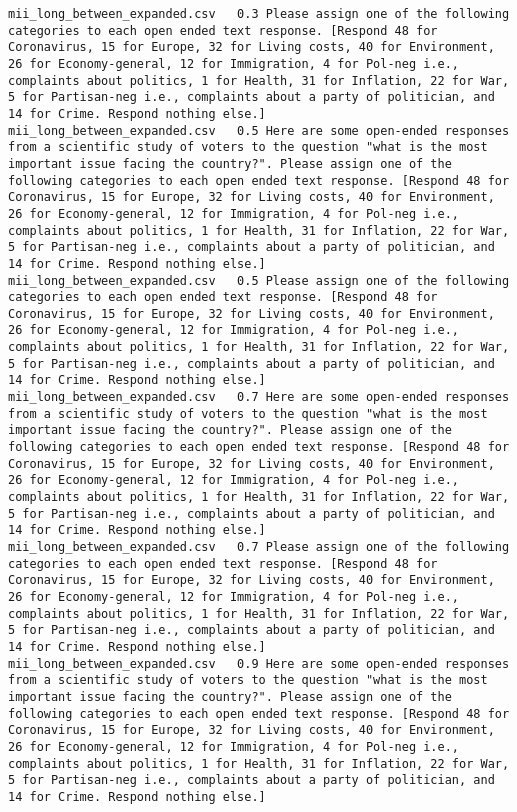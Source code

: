 \begin{lstlisting}[label=lst:promptvariants]
mii_long_between_expanded.csv	0.3	Please assign one of the following categories to each open ended text response. [Respond 48 for Coronavirus, 15 for Europe, 32 for Living costs, 40 for Environment, 26 for Economy-general, 12 for Immigration, 4 for Pol-neg i.e., complaints about politics, 1 for Health, 31 for Inflation, 22 for War, 5 for Partisan-neg i.e., complaints about a party of politician, and 14 for Crime. Respond nothing else.]
mii_long_between_expanded.csv	0.5	Here are some open-ended responses from a scientific study of voters to the question "what is the most important issue facing the country?". Please assign one of the following categories to each open ended text response. [Respond 48 for Coronavirus, 15 for Europe, 32 for Living costs, 40 for Environment, 26 for Economy-general, 12 for Immigration, 4 for Pol-neg i.e., complaints about politics, 1 for Health, 31 for Inflation, 22 for War, 5 for Partisan-neg i.e., complaints about a party of politician, and 14 for Crime. Respond nothing else.]
mii_long_between_expanded.csv	0.5	Please assign one of the following categories to each open ended text response. [Respond 48 for Coronavirus, 15 for Europe, 32 for Living costs, 40 for Environment, 26 for Economy-general, 12 for Immigration, 4 for Pol-neg i.e., complaints about politics, 1 for Health, 31 for Inflation, 22 for War, 5 for Partisan-neg i.e., complaints about a party of politician, and 14 for Crime. Respond nothing else.]
mii_long_between_expanded.csv	0.7	Here are some open-ended responses from a scientific study of voters to the question "what is the most important issue facing the country?". Please assign one of the following categories to each open ended text response. [Respond 48 for Coronavirus, 15 for Europe, 32 for Living costs, 40 for Environment, 26 for Economy-general, 12 for Immigration, 4 for Pol-neg i.e., complaints about politics, 1 for Health, 31 for Inflation, 22 for War, 5 for Partisan-neg i.e., complaints about a party of politician, and 14 for Crime. Respond nothing else.]
mii_long_between_expanded.csv	0.7	Please assign one of the following categories to each open ended text response. [Respond 48 for Coronavirus, 15 for Europe, 32 for Living costs, 40 for Environment, 26 for Economy-general, 12 for Immigration, 4 for Pol-neg i.e., complaints about politics, 1 for Health, 31 for Inflation, 22 for War, 5 for Partisan-neg i.e., complaints about a party of politician, and 14 for Crime. Respond nothing else.]
mii_long_between_expanded.csv	0.9	Here are some open-ended responses from a scientific study of voters to the question "what is the most important issue facing the country?". Please assign one of the following categories to each open ended text response. [Respond 48 for Coronavirus, 15 for Europe, 32 for Living costs, 40 for Environment, 26 for Economy-general, 12 for Immigration, 4 for Pol-neg i.e., complaints about politics, 1 for Health, 31 for Inflation, 22 for War, 5 for Partisan-neg i.e., complaints about a party of politician, and 14 for Crime. Respond nothing else.]

\end{lstlisting}
